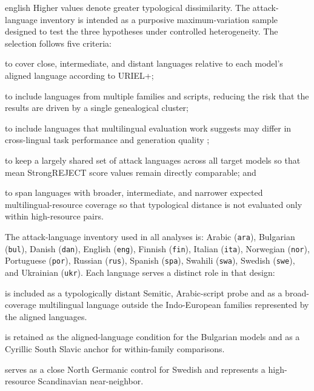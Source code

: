 \begin{otherlanguage*}{english}
Higher values denote greater typological dissimilarity. The attack-language inventory is intended as a purposive maximum-variation sample designed to test the three hypotheses under controlled heterogeneity. The selection follows five criteria:
\begin{alineas}
	\item to cover close, intermediate, and distant languages relative to each model's aligned language according to URIEL+;
	\item to include languages from multiple families and scripts, reducing the risk that the results are driven by a single genealogical cluster;
	\item to include languages that multilingual evaluation work suggests may differ in cross-lingual task performance and generation quality \cite{hu2020xtreme,chollampatt2025cross};
	\item to keep a largely shared set of attack languages across all target models so that mean StrongREJECT score values remain directly comparable; and 
	\item to span languages with broader, intermediate, and narrower expected multilingual-resource coverage so that typological distance is not evaluated only within high-resource pairs.
\end{alineas}

The attack-language inventory used in all analyses is: Arabic (\texttt{ara}), Bulgarian (\texttt{bul}), Danish (\texttt{dan}), English (\texttt{eng}), Finnish (\texttt{fin}), Italian (\texttt{ita}), Norwegian (\texttt{nor}), Portuguese (\texttt{por}), Russian (\texttt{rus}), Spanish (\texttt{spa}), Swahili (\texttt{swa}), Swedish (\texttt{swe}), and Ukrainian (\texttt{ukr}). Each language serves a distinct role in that design:

\begin{description}[style=multiline,leftmargin=2.2cm,labelwidth=1.6cm,font=\normalfont\ttfamily]

\item[ara] is included as a typologically distant Semitic, Arabic-script probe and as a broad-coverage multilingual language outside the Indo-European families represented by the aligned languages.

\item[bul] is retained as the aligned-language condition for the Bulgarian models and as a Cyrillic South Slavic anchor for within-family comparisons.

\item[dan] serves as a close North Germanic control for Swedish and represents a high-resource Scandinavian near-neighbor.


\end{description}
\end{otherlanguage*}
